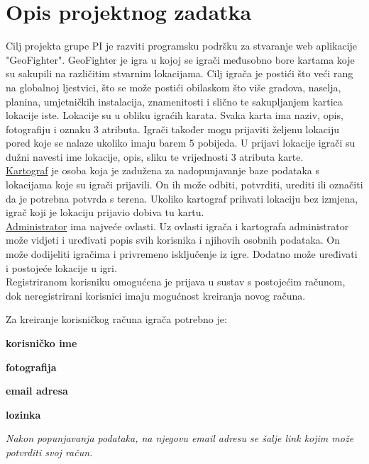 \chapter{Opis projektnog zadatka}
		
		
		\textnormal{Cilj projekta grupe PI je razviti programsku podršku za stvaranje web aplikacije "GeoFighter".  GeoFighter je igra u kojoj se igrači međusobno bore kartama koje su sakupili na različitim stvarnim lokacijama. Cilj igrača je postići što veći rang na globalnoj ljestvici, što se može postići obilaskom što više  gradova, naselja, planina, umjetničkih instalacija, znamenitosti i slično te sakupljanjem kartica lokacije iste. Lokacije su u obliku igraćih karata. Svaka karta ima naziv,  opis, fotografiju i oznaku 3 atributa. Igrači također mogu prijaviti željenu lokaciju pored koje se nalaze ukoliko imaju barem 5 pobijeda. U prijavi lokacije igrači su dužni navesti ime lokacije, opis, sliku te vrijednosti 3 atributa karte.} \\
		
		 \textnormal{\underline{Kartograf} je osoba koja je zadužena za nadopunjavanje baze podataka s lokacijama koje su igrači prijavili. On ih može odbiti, potvrditi, urediti ili označiti da je potrebna potvrda s terena. Ukoliko kartograf prihvati lokaciju bez izmjena, igrač koji je lokaciju  prijavio dobiva tu kartu.}\\
		
		\textnormal{\underline{Administrator} ima najveće ovlasti. Uz ovlasti igrača i kartografa administrator može vidjeti i uređivati popis svih korisnika i njihovih osobnih  podataka. On može dodijeliti  igračima i privremeno isključenje iz igre. Dodatno može uređivati i postojeće lokacije u igri.}\\
		
		\textnormal{Registriranom korisniku omogućena je prijava u sustav s postojećim računom, dok neregistrirani korisnici imaju mogućnost kreiranja novog računa.}
		
		\noindent\textnormal{Za kreiranje korisničkog računa igrača potrebno je:}
		\begin{packed_item}
			\item \textbf{korisničko ime}
			\item \textbf{fotografija}
			\item \textbf{email adresa}
			\item \textbf{lozinka}
		\end{packed_item}
		\textit{Nakon  popunjavanja  podataka,  na njegovu email adresu se šalje link kojim može potvrditi svoj račun.}\\
		

